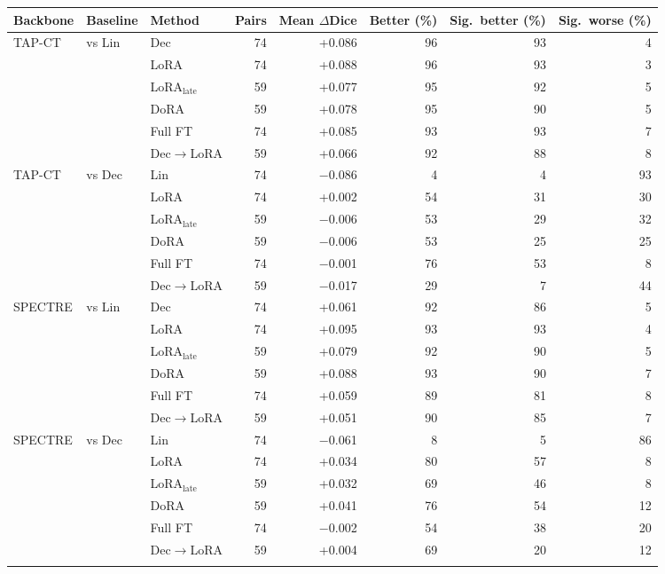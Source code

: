 \begin{tabular}{lllrrrrr}
\toprule
Backbone & Baseline & Method & Pairs & Mean $\Delta$Dice & Better (\%) & Sig.\ better (\%) & Sig.\ worse (\%) \\
\midrule
TAP-CT & vs Lin & Dec & 74 & +0.086 & 96 & 93 & 4 \\
 &  & LoRA & 74 & +0.088 & 96 & 93 & 3 \\
 &  & LoRA$_{\text{late}}$ & 59 & +0.077 & 95 & 92 & 5 \\
 &  & DoRA & 59 & +0.078 & 95 & 90 & 5 \\
 &  & Full FT & 74 & +0.085 & 93 & 93 & 7 \\
 &  & Dec$\to$LoRA & 59 & +0.066 & 92 & 88 & 8 \\
\addlinespace[2pt]
TAP-CT & vs Dec & Lin & 74 & $-$0.086 & 4 & 4 & 93 \\
 &  & LoRA & 74 & +0.002 & 54 & 31 & 30 \\
 &  & LoRA$_{\text{late}}$ & 59 & $-$0.006 & 53 & 29 & 32 \\
 &  & DoRA & 59 & $-$0.006 & 53 & 25 & 25 \\
 &  & Full FT & 74 & $-$0.001 & 76 & 53 & 8 \\
 &  & Dec$\to$LoRA & 59 & $-$0.017 & 29 & 7 & 44 \\
\addlinespace[2pt]
SPECTRE & vs Lin & Dec & 74 & +0.061 & 92 & 86 & 5 \\
 &  & LoRA & 74 & +0.095 & 93 & 93 & 4 \\
 &  & LoRA$_{\text{late}}$ & 59 & +0.079 & 92 & 90 & 5 \\
 &  & DoRA & 59 & +0.088 & 93 & 90 & 7 \\
 &  & Full FT & 74 & +0.059 & 89 & 81 & 8 \\
 &  & Dec$\to$LoRA & 59 & +0.051 & 90 & 85 & 7 \\
\addlinespace[2pt]
SPECTRE & vs Dec & Lin & 74 & $-$0.061 & 8 & 5 & 86 \\
 &  & LoRA & 74 & +0.034 & 80 & 57 & 8 \\
 &  & LoRA$_{\text{late}}$ & 59 & +0.032 & 69 & 46 & 8 \\
 &  & DoRA & 59 & +0.041 & 76 & 54 & 12 \\
 &  & Full FT & 74 & $-$0.002 & 54 & 38 & 20 \\
 &  & Dec$\to$LoRA & 59 & +0.004 & 69 & 20 & 12 \\
\addlinespace[2pt]
\bottomrule
\end{tabular}
